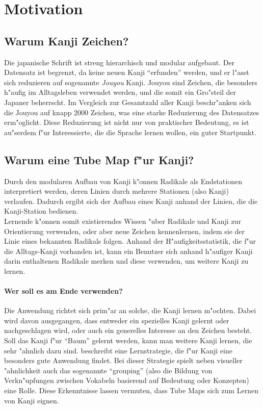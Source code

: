 \section{Motivation}
\subsection{Warum Kanji Zeichen?}
Die japanische Schrift ist streng hierarchisch und modular aufgebaut. Der Datensatz ist begrenzt, da keine neuen Kanji "`erfunden"' werden, und er l"asst sich reduzieren auf sogenannte \emph{Jouyou} Kanji. Jouyou sind Zeichen, die besonders h"aufig im Alltagsleben verwendet werden, und die somit ein Gro"steil der Japaner beherrscht. Im Vergleich zur Gesamtzahl aller Kanji beschr"anken sich die Jouyou auf knapp 2000 Zeichen, was eine starke Reduzierung des Datensatzes erm"oglicht.
Diese Reduzierung ist nicht nur von praktischer Bedeutung, es ist au"serdem f"ur Interessierte, die die Sprache lernen wollen, ein guter Startpunkt. 

\subsection{Warum eine Tube Map f"ur Kanji?}
Durch den modularen Aufbau von Kanji k"onnen Radikale als Endstationen interpretiert werden, deren Linien durch mehrere Stationen (also Kanji) verlaufen. Dadurch ergibt sich der Aufbau eines Kanji anhand der Linien, die die Kanji-Station bedienen. \\
Lernende k"onnen somit existierendes Wissen "uber Radikale und Kanji zur Orientierung verwenden, oder aber neue Zeichen kennenlernen, indem sie der Linie eines bekannten Radikals folgen. Anhand der H"aufigkeitsstatistik, die f"ur die Alltags-Kanji vorhanden ist, kann ein Benutzer sich anhand h"aufiger Kanji darin enthaltenen Radikale merken und diese verwenden, um weitere Kanji zu lernen. 
\paragraph{Wer soll es am Ende verwenden?}
Die Anwendung richtet sich prim"ar an solche, die Kanji lernen m"ochten. Dabei wird davon ausgegangen, dass entweder ein spezielles Kanji gelernt oder nachgeschlagen wird, oder auch ein generelles Interesse an den Zeichen besteht. Soll das Kanji f"ur "`Baum"' gelernt werden, kann man weitere Kanji lernen, die sehr "ahnlich dazu sind.  
\cite{kanjilearningjapanese10} beschreibt eine Lernstrategie, die f"ur Kanji eine besonders gute Anwendung findet. Bei dieser Strategie spielt neben visueller "ahnlichkeit auch das sogenannte "`grouping"' (also die Bildung von Verkn"upfungen zwischen Vokabeln basierend auf Bedeutung oder Konzepten) eine Rolle. Diese Erkenntnisse lassen vermuten, dass Tube Maps sich zum Lernen von Kanji eignen.
